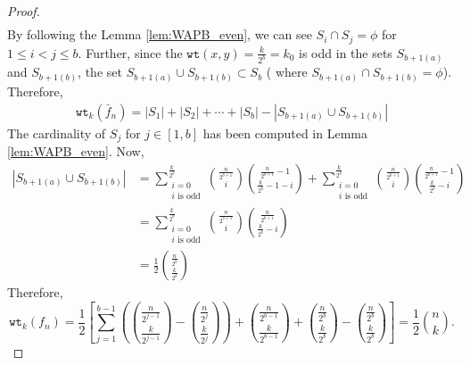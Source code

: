 \documentclass{article}[12pt]
\newcommand{\wt}{\mathtt{wt}}
\begin{document}
\begin{proof}
\begin{eqnarray*}
\end{eqnarray*}
By following the Lemma \ref{lem:WAPB_even}, we can see $S_i \cap S_j= \phi$ for $1 \leq i < j \leq b$. Further, since the $\wt(x,y)= \frac{k}{2^b}= k_0$ is odd in the sets $S_{b+1(a)}$ and $S_{b+1(b)}$, the set $S_{b+1(a)} \cup S_{b+1(b)} \subset S_b$ ( where $S_{b+1(a)} \cap S_{b+1(b)} = \phi$). Therefore,
\begin{align*}
	\wt_{k}(\bar{f}_n) = |S_1|+ |S_2| + \cdots + |S_b|- |S_{b+1(a)} \cup S_{b+1(b)}|
\end{align*} 
The cardinality of $S_j$ for $j \in [1,b]$ has been computed in Lemma \ref{lem:WAPB_even}. Now, 
\begin{align*}
	|S_{b+1(a)} \cup S_{b+1(b)}| & =  \sum_{\substack{i = 0 \\ i \text{ is odd}}}^{\frac{k}{2^b}} {\frac{n}{2^{b+1}} \choose i}{\frac{n}{2^{b+1}}-1 \choose {\frac{k}{2^b}-1-i}} + \sum_{\substack{i = 0 \\ i \text{ is odd}}}^{\frac{k}{2^b}} {\frac{n}{2^{b+1}} \choose i}{\frac{n}{2^{b+1}}-1 \choose {\frac{k}{2^b}-i}} \\
	& =  \sum_{\substack{i = 0 \\ i \text{ is odd}}}^{\frac{k}{2^b}} {\frac{n}{2^{b+1}} \choose i}{\frac{n}{2^{b+1}} \choose \frac{k}{2^b}-i }	\\
	& = \frac{1}{2} { \frac{n}{2^b} \choose \frac{k}{2^b}}
\end{align*}
Therefore, 
$$\displaystyle{\wt_k(f_n) = \frac{1}{2}\left[\sum_{j = 1}^{b-1} \left({\frac{n}{2^{j-1}} \choose \frac{k}{2^{j-1}}} - {\frac{n}{2^j} \choose \frac{k}{2^j}}\right) + {\frac{n}{2^{b-1}} \choose \frac{k}{2^{b-1}}} + {\frac{n}{2^b} \choose \frac{k}{2^b}} - {\frac{n}{2^b} \choose \frac{k}{2^b}}\right] = \frac{1}{2}{n \choose k}}.$$


\end{proof}
\end{document}
